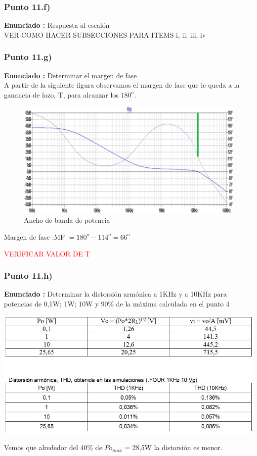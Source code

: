 \documentclass[12pt]{book}
\begin{document}
\subsubsection{Punto 11.f)}
\textbf{Enunciado : } Respuesta al escalón\\[1cm]
VER COMO HACER SUBSECCIONES PARA ITEMS i, ii, iii, iv

\subsubsection{Punto 11.g)}
\textbf{Enunciado : } Determinar el margen de fase\\[1cm]
A partir de la siguiente figura observamos el margen de fase que le queda a la ganancia de lazo, T, para alcanzar los $180^o$.
\begin{figure}[H]
\centering
\includegraphics[scale=0.4]{figuras/11-g-margenFase.png}
\caption{Ancho de banda de potencia}
\label{figura11g}
\end{figure}
\begin{center}
Margen de fase :\quad MF $=180^{o}-114^{o}=66^{o}$
\end{center}
\textcolor{red}{VERIFICAR VALOR DE T}

\subsubsection{Punto 11.h)}
\textbf{Enunciado : } Determinar la distorsión armónica a 1KHz y a 10KHz para potencias de 0,1W; 1W; 10W y 90\% de la máxima calculada en el punto 4\\[1cm]
\begin{center}
\includegraphics[scale=0.5]{figuras/tabla2.jpg}\\
\end{center}
Vemos que alrededor del 40\% de $Po_{max}$ = 28,5W la distorsión es menor.
\end{document}
